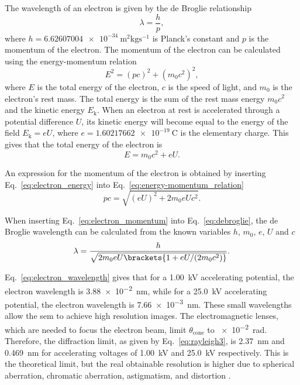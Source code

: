 The wavelength of an electron is given by the de Broglie relationship \citep{de1924recherches}
\begin{equation}
\label{eq:debroglie}
\lambda = \frac{h}{p},
\end{equation}
where $h=\SI{6.62607004e-34}{\metre^2\kilo\gram\second^{-1}}$ is Planck's constant and $p$ is the momentum of the electron. The momentum of the electron can be calculated using the energy-momentum relation
\begin{equation}
\label{eq:energy-momentum_relation}
E^2 = (pc)^2 + (m_0c^2)^2,
\end{equation}
where $E$ is the total energy of the electron, $c$ is the speed of light, and $m_0$ is the electron's rest mass. The total energy is the sum of the rest mass energy $m_0c^2$ and the kinetic energy $E_\mathrm{k}$. When an electron at rest is accelerated through a potential difference $U$, its kinetic energy  will become equal to the energy of the field $E_\textrm{k} = e U$, where $e=\SI{1.60217662e-19}{\coulomb}$ is the elementary charge. This gives that the total energy of the electron is
\begin{equation}
\label{eq:electron_energy}
E = m_0c^2 + eU.
\end{equation}

An expression for the momentum of the electron is obtained by inserting Eq.~\eqref{eq:electron_energy} into Eq.~\eqref{eq:energy-momentum_relation}
\begin{equation}
\label{eq:electron_momentum}
pc = \sqrt{(eU)^2 + 2m_0eUc^2}.
\end{equation}

When inserting Eq.~\ref{eq:electron_momentum} into Eq.~\ref{eq:debroglie}, the de Broglie wavelength can be calculated from the known variables $h$, $m_0$, $e$, $U$ and $c$
\begin{equation}
\label{eq:electron_wavelength}
\lambda = \frac{h}{\sqrt{2m_0eU\brackets{1 + eU/(2m_0c^2)}}}.
\end{equation}

Eq.~\ref{eq:electron_wavelength} gives that for a \SI{1.00}{\kilo\volt} accelerating potential, the electron wavelength is \SI{3.88e-2}{\nano\metre}, while for a \SI{25.0}{\kilo\volt} accelerating potential, the electron wavelength is \SI{7.66e-3}{\nano\metre}. These small wavelengths allow the \ac{sem} to achieve high resolution images. The electromagnetic lenses, which are needed to focus the electron beam, limit $\theta_\text{cone}$ to \SI{e-2}{\radian}. Therefore, the diffraction limit, as given by Eq.~\eqref{eq:rayleigh3}, is \SI{2.37}{\nano\metre} and \SI{0.469}{\nano\metre} for accelerating voltages of \SI{1.00}{\kilo\volt} and \SI{25.0}{\kilo\volt} respectively. This is the theoretical limit, but the real obtainable resolution is higher due to spherical aberration, chromatic aberration, astigmatism, and distortion \citep{brandon2013microstructural}.


